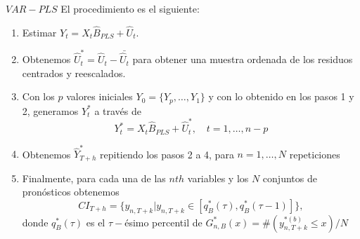 \documentclass{beamer}
\newcommand{\?}{?`}
\begin{document}
\begin{frame}{$VAR-PLS$}
  El procedimiento es el siguiente:
  \begin{footnotesize}
  \begin{enumerate}
  \item Estimar $Y_t=X_t\hat{B}_{PLS}+\hat{U}_t$.
  \item Obtenemos $\hat{U}_t^{*}=\hat{U}_t-\bar{\hat{U}_t}$ para
    obtener una muestra ordenada de los residuos centrados y
    reescalados.
  \item Con los $p$ valores iniciales $Y_0=\lbrace Y_p,\ldots,Y_1\rbrace$ y
    con lo obtenido en los pasos 1 y 2, generamos $Y_t^{*}$ a
    trav\'es de
    \begin{displaymath}
      Y_t^{*}=X_t\hat{B}_{PLS}+\hat{U}_t^{*}, \quad t=1,\ldots,n-p
    \end{displaymath}
  \item Obtenemos $\hat{Y}_{T+h}^{*}$ repitiendo los pasos 2 a 4, para
    $n=1,\ldots,N$ repeticiones
  \item Finalmente, para cada una de las $nth$ variables y los $N$
    conjuntos de pron\'osticos obtenemos
    \begin{displaymath}
      CI_{T+h}=\lbrace y_{n,T+k}|y_{n,T+k} \in
      [q_B^{*}(\tau),q_B^{*}(\tau-1)] \rbrace,
    \end{displaymath}
    donde $q_B^{*}(\tau)$ es el $\tau-$\'esimo percentil de
    $G_{n,B}^{*}(x)=\#\left(y_{n,T+k}^{*(b)}\leq x\right)/N$
  \end{enumerate}
  \end{footnotesize}
\end{frame}
\end{document}
